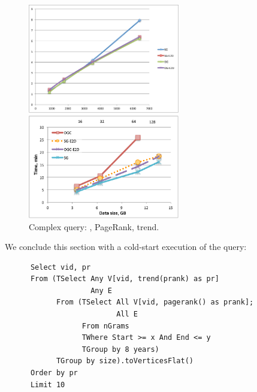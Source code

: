 \begin{figure}[t]
\centering
\begin{minipage}{3in}
  \centering
  \includegraphics[width=2.6in]{figs/trend_degrees.pdf}
  \vspace{-0.1in}
  \caption{.}
  \label{fig:trend_deg}
  \vspace{-0.1in}
\end{minipage}
\begin{minipage}{3in}
  \centering
\includegraphics[width=2.6in]{figs/complexq.pdf}
  \vspace{-0.1in}
\caption{Complex query: , PageRank, trend.}
\label{fig:complexq}
  \vspace{-0.1in}
\end{minipage}
\end{figure}


We conclude this section with a cold-start execution of
the query:

\begin{small}
\begin{verbatim}
      Select vid, pr
      From (TSelect Any V[vid, trend(prank) as pr]
                    Any E
            From (TSelect All V[vid, pagerank() as prank]; 
                          All E
                  From nGrams
                  TWhere Start >= x And End <= y
                  TGroup by 8 years)
            TGroup by size).toVerticesFlat()
      Order by pr
      Limit 10
\end{verbatim}
\end{small}


